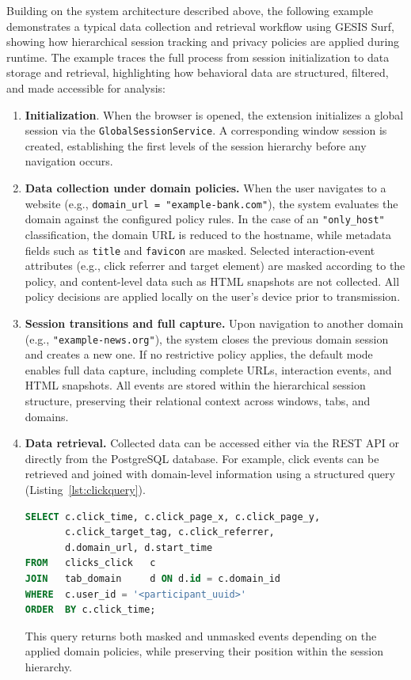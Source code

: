 \documentclass[preprint,12pt,a4paper]{elsarticle}
\begin{document}
Building on the system architecture described above, the following example demonstrates a typical data collection and retrieval workflow using GESIS Surf, showing how hierarchical session tracking and privacy policies are applied during runtime. The example traces the full process from session initialization to data storage and retrieval, highlighting how behavioral data are structured, filtered, and made accessible for analysis:

  \begin{enumerate}
    \item \textbf{Initialization}. When the browser is opened, the extension initializes a global session via the \texttt{GlobalSessionService}. A corresponding window session is created, establishing the first levels of the session hierarchy before any navigation occurs.
    \item \textbf{Data collection under domain policies.} When the user navigates to a website (e.g., \texttt{domain\_url = "example-bank.com"}), the system evaluates the domain against the configured policy rules. In the case of an \texttt{"only\_host"} classification, the domain URL is reduced to the hostname, while metadata fields such as \texttt{title} and \texttt{favicon} are masked. Selected interaction-event attributes (e.g., click referrer and target element) are masked according to the policy, and content-level data such as HTML snapshots are not collected. All policy decisions are applied locally on the user's device prior to transmission.
\item \textbf{Session transitions and full capture.} Upon navigation to another domain (e.g., \texttt{"example-news.org"}), the system closes the previous domain session and creates a new one. If no restrictive policy applies, the default mode enables full data capture, including complete URLs, interaction events, and HTML snapshots. All events are stored within the hierarchical session structure, preserving their relational context across windows, tabs, and domains.

    \item \textbf{Data retrieval.}
    Collected data can be accessed either via the REST API or directly from the PostgreSQL database. For example, click events can be retrieved and joined with domain-level information using a structured query (Listing~\ref{lst:clickquery}).

\begin{lstlisting}[language=SQL,
  caption={Retrieving a participant's click events joined with their domain-level context.},
  label={lst:clickquery}]
SELECT c.click_time, c.click_page_x, c.click_page_y,
       c.click_target_tag, c.click_referrer,
       d.domain_url, d.start_time
FROM   clicks_click   c
JOIN   tab_domain     d ON d.id = c.domain_id
WHERE  c.user_id = '<participant_uuid>'
ORDER  BY c.click_time;
\end{lstlisting}

This query returns both masked and unmasked events depending on the applied domain policies, while preserving their position within the session hierarchy.

  \end{enumerate}
\end{document}
